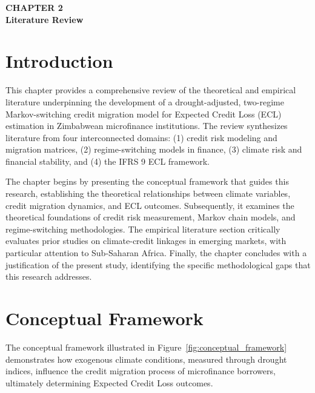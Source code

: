 \documentclass[12pt,a4paper]{article}
\begin{document}
\newpage

\begin{center}
    {\LARGE\bfseries CHAPTER 2}\\[0.5cm]
    {\Large\bfseries Literature Review}
\end{center}
\setcounter{section}{0}
\renewcommand{\thesection}{2.\arabic{section}}

\vspace{1cm}

\section{Introduction}

This chapter provides a comprehensive review of the theoretical and empirical literature underpinning the development of a drought-adjusted, two-regime Markov-switching credit migration model for Expected Credit Loss (ECL) estimation in Zimbabwean microfinance institutions. The review synthesizes literature from four interconnected domains: (1) credit risk modeling and migration matrices, (2) regime-switching models in finance, (3) climate risk and financial stability, and (4) the IFRS 9 ECL framework. 

The chapter begins by presenting the conceptual framework that guides this research, establishing the theoretical relationships between climate variables, credit migration dynamics, and ECL outcomes. Subsequently, it examines the theoretical foundations of credit risk measurement, Markov chain models, and regime-switching methodologies. The empirical literature section critically evaluates prior studies on climate-credit linkages in emerging markets, with particular attention to Sub-Saharan Africa. Finally, the chapter concludes with a justification of the present study, identifying the specific methodological gaps that this research addresses.

\section{Conceptual Framework}

The conceptual framework illustrated in Figure~\ref{fig:conceptual_framework} demonstrates how exogenous climate conditions, measured through drought indices, influence the credit migration process of microfinance borrowers, ultimately determining Expected Credit Loss outcomes.
\end{document}
